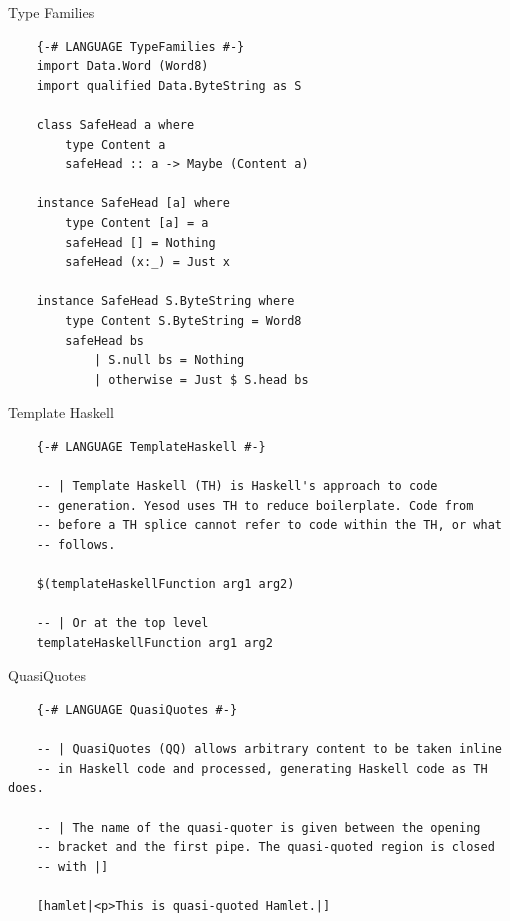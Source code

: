 \documentclass[pdf]{beamer}
\begin{document}
\begin{frame}[fragile]{Type Families}
  \begin{verbatim}
    {-# LANGUAGE TypeFamilies #-}
    import Data.Word (Word8)
    import qualified Data.ByteString as S
    
    class SafeHead a where
        type Content a
        safeHead :: a -> Maybe (Content a)
    
    instance SafeHead [a] where
        type Content [a] = a
        safeHead [] = Nothing
        safeHead (x:_) = Just x
    
    instance SafeHead S.ByteString where
        type Content S.ByteString = Word8
        safeHead bs
            | S.null bs = Nothing
            | otherwise = Just $ S.head bs
  \end{verbatim}
\end{frame}

\begin{frame}[fragile]{Template Haskell}
  \begin{verbatim}
    {-# LANGUAGE TemplateHaskell #-}
    
    -- | Template Haskell (TH) is Haskell's approach to code
    -- generation. Yesod uses TH to reduce boilerplate. Code from
    -- before a TH splice cannot refer to code within the TH, or what
    -- follows.

    $(templateHaskellFunction arg1 arg2)

    -- | Or at the top level
    templateHaskellFunction arg1 arg2
  \end{verbatim}
\end{frame}

\begin{frame}[fragile]{QuasiQuotes}
  \begin{verbatim}
    {-# LANGUAGE QuasiQuotes #-}
    
    -- | QuasiQuotes (QQ) allows arbitrary content to be taken inline
    -- in Haskell code and processed, generating Haskell code as TH does.

    -- | The name of the quasi-quoter is given between the opening
    -- bracket and the first pipe. The quasi-quoted region is closed
    -- with |]

    [hamlet|<p>This is quasi-quoted Hamlet.|]
  \end{verbatim}
\end{frame}
\end{document}
